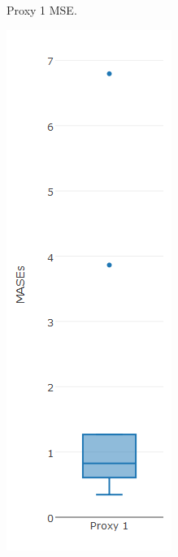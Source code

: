 \begin{figure}[!h]
{\begin{subfigure}{.25\linewidth}
  \caption{Proxy 1 MSE.}
  \label{fig:bp2.1a}
\end{subfigure}%
\begin{subfigure}{.25\linewidth}
  \centering
  \includegraphics[width=\linewidth]{img/10ysigmaMasebpKnn.png}

\end{subfigure}}
\end{figure}
